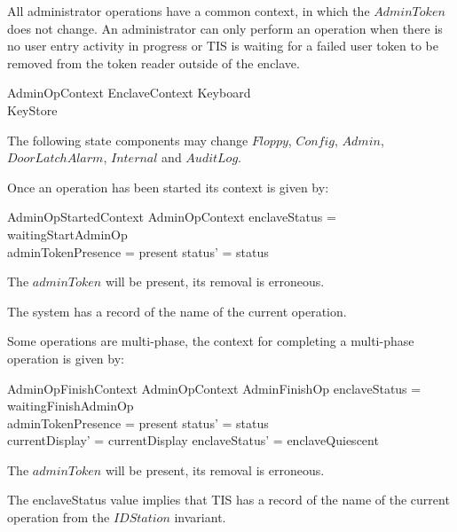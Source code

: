 All administrator operations have a common context, in which the
$AdminToken$ does not change.
An administrator can only perform an operation when there is no user 
entry activity
in progress or TIS is waiting for a failed user token to be removed
from the token reader outside of the enclave.


\begin{schema}{AdminOpContext}
        EnclaveContext
\also
        \Xi Keyboard
\\      \Xi KeyStore
\end{schema}
\begin{Zcomment}
\item
The following state components may change   
$Floppy$, $Config$, $Admin$, $DoorLatchAlarm$, $Internal$ and $AuditLog$. 
\end{Zcomment}

Once an operation has been started its context is given by:

\begin{schema}{AdminOpStartedContext}
        AdminOpContext
\where
        enclaveStatus = waitingStartAdminOp
\\      adminTokenPresence = present
\also
        status' = status
\end{schema}
\begin{Zcomment}
\item
The $adminToken$ will be present, its removal is erroneous.
\item
The system has a record of the name of the current operation.
\end{Zcomment}

Some operations are multi-phase, the context for completing a
multi-phase operation is given by: 

\begin{schema}{AdminOpFinishContext}
        AdminOpContext
\also
        AdminFinishOp
\where
        enclaveStatus = waitingFinishAdminOp
\\      adminTokenPresence = present
\also
        status' = status
\\      currentDisplay' = currentDisplay
\also
        enclaveStatus' = enclaveQuiescent
\end{schema}
\begin{Zcomment}
\item
The $adminToken$ will be present, its removal is erroneous.
\item
The enclaveStatus value implies that TIS has a record of the name of the
current operation from the $IDStation$ invariant.
\end{Zcomment}


